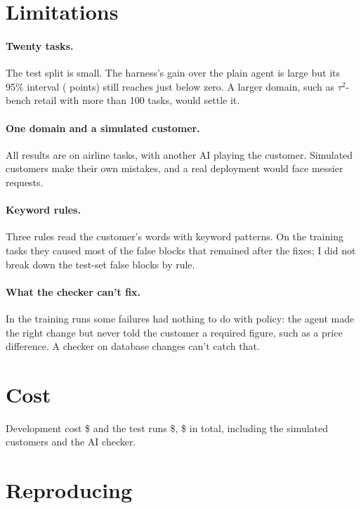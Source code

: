 \documentclass[11pt]{article}
\begin{document}
\section{Limitations}

\paragraph{Twenty tasks.} The test split is small. The harness's gain over
the plain agent is large but its 95\% interval (\BvACI{} points) still reaches
just below zero. A larger domain, such as $\tau^2$-bench retail with more than
100 tasks, would settle it.

\paragraph{One domain and a simulated customer.} All results are on airline
tasks, with another AI playing the customer. Simulated customers make their
own mistakes, and a real deployment would face messier requests.

\paragraph{Keyword rules.} Three rules read the customer's words with keyword
patterns. On the training tasks they caused most of the false blocks that
remained after the fixes; I did not break down the test-set false blocks by
rule.

\paragraph{What the checker can't fix.} In the training runs some failures had
nothing to do with policy: the agent made the right change but never told the
customer a required figure, such as a price difference. A checker on database
changes can't catch that.

\section{Cost}

Development cost \$\DevSpend{} and the test runs \$\TestSpend{}, \$\StudySpend{}
in total, including the simulated customers and the AI checker.

\section{Reproducing}
\end{document}
